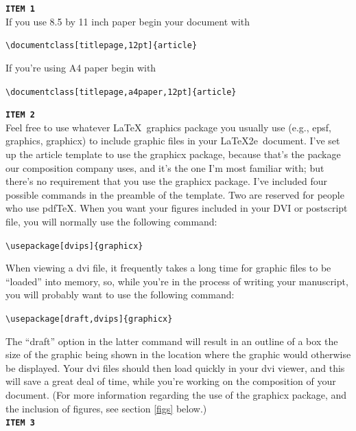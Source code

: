 \documentclass[titlepage,12pt]{article}
\begin{document}
\longpage

\noindent\texttt{\bf ITEM 1}\\[1.5ex]

If you use 8.5 by 11 inch paper begin your document with
\begin{center}\verb=\documentclass[titlepage,12pt]{article}=\end{center}
If you're using A4 paper begin with
\begin{center}\verb=\documentclass[titlepage,a4paper,12pt]{article}=\end{center}


\noindent\texttt{\bf ITEM 2}\\[1.5ex]

Feel free to use whatever \LaTeX\ graphics package you usually use
(e.g., epsf, graphics, graphicx) to include graphic files in your
\LaTeX2e\ document. I've set up the article template to use the
graphicx package, because that's the package our composition
company uses, and it's the one I'm most familiar with; but there's
no requirement that you use the graphicx package. I've included
four possible commands in the preamble of the template. Two are
reserved for people who use pdf\TeX. When you want your figures
included in your DVI or postscript file, you will normally use the
following command:

\begin{center}\verb=\usepackage[dvips]{graphicx}=\end{center}

\noindent When viewing a dvi file, it frequently takes a long time
for graphic files to be ``loaded'' into memory, so, while you're
in the process of writing your manuscript, you will probably want
to use the following command:

\begin{center}\verb=\usepackage[draft,dvips]{graphicx}=\end{center}

\noindent The ``draft'' option in the latter command will result
in an outline of a box the size of the graphic being shown in the
location where the graphic would otherwise be displayed. Your dvi
files should then load quickly in your dvi viewer, and this will
save a great deal of time, while you're working on the composition
of your document. (For more information regarding the use of the
graphicx package, and the inclusion of figures, see section
\ref{figs} below.)\\[1.5ex]

\noindent\texttt{\bf ITEM 3}\\[1.5ex]
\end{document}
